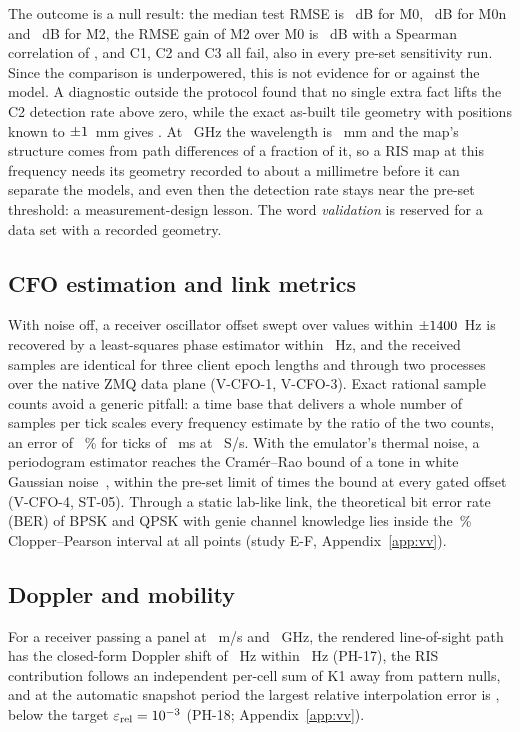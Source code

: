 The outcome is a null result: the median test RMSE is
\numLabRmseMzero~dB for M0, \numLabRmseMzeroN~dB for M0n and \numLabRmseMtwo~dB for M2, the
RMSE gain of M2 over M0 is \numLabDeltaRmse~dB with a Spearman correlation of
\numLabSpearman, and C1, C2 and C3 all fail, also in every pre-set sensitivity run. Since the
comparison is underpowered, this is not evidence for or against the model.
A diagnostic outside the protocol found that no single extra fact lifts the
C2 detection rate above zero, while the exact as-built tile geometry with positions known to
$\pm1$~mm gives \numLabDiagRate. At \numLabFreqGHz~GHz the wavelength is
\numLabLambdaMm~mm and the map's structure comes from path differences of a fraction of it, so
a RIS map at this frequency needs its geometry recorded to about a millimetre before it can
separate the models, and even then the detection rate stays near the pre-set threshold: a
measurement-design lesson. The word \emph{validation} is reserved
for a data set with a recorded geometry.

\subsection{CFO estimation and link metrics}\label{sec:vv-cfo}
With noise off, a receiver oscillator offset swept over \numCfoSweepPoints{}
values within $\pm1400$~Hz is recovered by a least-squares phase estimator
within \numCfoLsMaxErrHz~Hz, and the received samples are identical for three client epoch
lengths and through two processes over the native ZMQ data plane (V-CFO-1, V-CFO-3).
Exact rational sample counts avoid a generic pitfall: a time base that
delivers a whole number of samples per tick scales every frequency estimate by the ratio of
the two counts, an error of \numCfoTickScalePct~\% for ticks of \numCfoTickMs~ms at
\numCfoRateSps~S/s. With the emulator's thermal noise, a periodogram estimator
reaches the Cram\'er--Rao bound of a tone in white Gaussian noise~\cite{Kay1989Freq}, within
the pre-set limit of \numCfoGateFactor{} times the bound at every gated offset (V-CFO-4,
ST-05). Through a static lab-like link, the theoretical bit error rate (BER) of
BPSK and QPSK with genie channel knowledge lies inside the \numCiPct\,\% Clopper--Pearson
interval at all \numBerPoints{} points (study E-F, Appendix~\ref{app:vv}).

\subsection{Doppler and mobility}\label{sec:vv-doppler}
For a receiver passing a panel at \numDopVms~m/s and \numDopFcGHz~GHz, the
rendered line-of-sight path has the closed-form Doppler shift of \numDopLosHz~Hz within
\numDopLosDevHz~Hz (PH-17), the RIS contribution follows an independent per-cell sum of K1
away from pattern nulls, and at the automatic snapshot period the largest relative
interpolation error is \numDopErrAuto, below the target $\varepsilon_{\mathrm{rel}}=10^{-3}$
(PH-18; Appendix~\ref{app:vv}).
